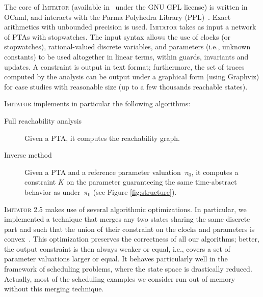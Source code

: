 \documentclass{llncs}
\newcommand{\pio}{\pi_0}
\newcommand{\IM}{\mathit{IM}}
\newcommand{\graphviz}{Graphviz}
\newcommand{\hytech}{{\sc HyTech}}
\newcommand{\imitator}{\textsc{Imitator}}
\begin{document}
The core of \imitator{} (available in~\cite{imitator-web} under the GNU GPL license) is written in OCaml, and interacts with the Parma Polyhedra Library (PPL)~\cite{bhz08}.
Exact arithmetics with unbounded precision is used.
% 
\imitator{} takes as input a network of PTAs with stopwatches.
The input syntax %
allows the use of clocks (or stopwatches), rational-valued discrete variables, and parameters (i.e., unknown constants) to be used altogether in linear terms, within guards, invariants and updates.
% 
A constraint is output in text format; furthermore, the set of traces computed by the analysis can be output under a graphical form (using \graphviz{}) for case studies with reasonable size (up to a few thousands reachable states).

\imitator{} implements in particular the following algorithms:
\begin{description}
	\item[Full reachability analysis] Given a PTA, it computes the reachability graph.
	\item[Inverse method] Given a PTA and a reference parameter valuation~$\pio$, it computes a constraint $K$ on the parameter guaranteeing the same time-abstract behavior as under~$\pio$ (see Figure \ref{fig:structure}).
\end{description}

\imitator{} 2.5 makes use of several algorithmic optimizations.
In particular, we implemented a technique that merges any two states sharing the same discrete part %
and such that the union of their constraint on the clocks and parameters is convex~\cite{AFS12}.
This optimization preserves the correctness of all our algorithms; better, the output constraint 
is then always weaker or equal, i.e., covers a set of parameter valuations larger or equal.
It behaves particularly well in the framework of scheduling problems, where the state space is drastically reduced.
Actually, most of the scheduling examples we consider run out of memory without this merging technique.




\end{document}
